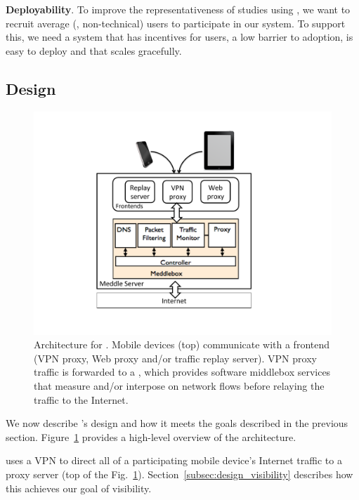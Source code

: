 \noindent\textbf{Deployability}. To improve the representativeness of studies using \meddle, we want to 
recruit average (\ie, non-technical) users to participate in our system. To support this, we need a system 
that has incentives for users, a low barrier to adoption, is easy to deploy and that scales gracefully. 
  
  

\subsection{Design}

\begin{figure}[tb]
\centering
\includegraphics[width=0.8\columnwidth]{figures/meddle-diagram.pdf}
\caption{Architecture for \meddle. Mobile devices (top) communicate with 
a \meddle frontend (VPN proxy, Web proxy and/or 
traffic replay server). VPN proxy traffic is forwarded to a \meddlebox, which provides 
software middlebox services that measure and/or interpose on network flows before 
relaying the traffic to the Internet.  }
\vspace{\postfigspace}
\label{fig:architecture}
\end{figure}

We now describe \meddle's design and how 
it meets the goals described in the previous section. Figure~\ref{fig:architecture} 
provides a high-level overview of the \meddle architecture.

\meddle uses a VPN to direct all of a participating 
mobile device's Internet traffic to a proxy server (top of the Fig.~\ref{fig:architecture}). 
Section~\ref{subsec:design_visibility} describes how this achieves our goal of visibility.

